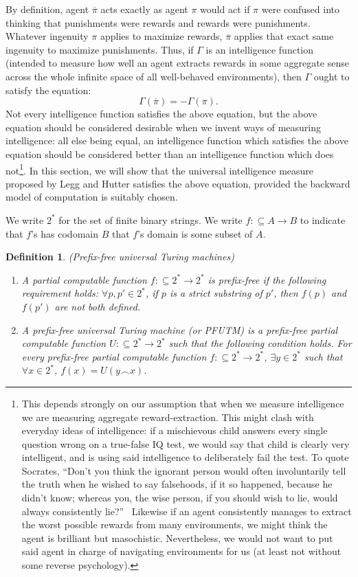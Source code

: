 \documentclass{article}
\newtheorem{definition}[theorem]{Definition}
\begin{document}
By definition, agent $\overline\pi$ acts exactly as agent $\pi$ would
act if $\pi$ were confused into thinking that punishments were rewards
and rewards were punishments.
Whatever ingenuity $\pi$ applies to maximize rewards,
$\overline\pi$ applies that exact same ingenuity to maximize punishments.
Thus, if $\Gamma$ is an intelligence function (intended to measure how
well an agent extracts rewards in some aggregate sense across the whole
infinite space of all well-behaved environments), then $\Gamma$ ought
to satisfy the equation:
\[
    \Gamma(\overline\pi) = -\Gamma(\pi).
\]
Not every intelligence function satisfies the above equation, but the
above equation should be considered desirable when we
invent ways of measuring intelligence: all else being equal, an
intelligence function which satisfies the above equation should be
considered better than an intelligence function which does
not\footnote{This depends strongly on our assumption that when we
measure intelligence we are measuring aggregate reward-extraction. This might clash
with everyday ideas of intelligence: if a mischievous child answers every single
question wrong on a true-false IQ test, we would say that child is clearly very
intelligent, and is using said intelligence to deliberately fail the test.
To quote Socrates, ``Don't you think the ignorant person would often involuntarily
tell the truth when he wished to say falsehoods, if it so happened, because he
didn't know; whereas you, the wise person, if you should wish to lie,
would always consistently lie?''\ \cite{lesserhippias}
Likewise if an agent consistently manages to extract the worst possible rewards
from many environments, we might think the agent is brilliant but
masochistic.
Nevertheless, we would not want to put said agent
in charge of navigating environments for us (at least not without some
reverse psychology).}.
In this section, we will show that the universal intelligence measure
proposed by Legg and Hutter satisfies the above equation, provided the
backward model of computation is suitably chosen.

We write $2^*$ for the set of finite binary strings.
We write $f:\subseteq A\to B$ to indicate that $f$'s has codomain $B$
that $f$'s domain is some subset of $A$.

\begin{definition}
    (Prefix-free universal Turing machines)
    \begin{enumerate}
        \item A partial computable function $f:\subseteq 2^*\to 2^*$
        is \emph{prefix-free} if the following requirement holds:
        $\forall p,p'\in 2^*$, if $p$ is a strict substring of $p'$,
        then $f(p)$ and $f(p')$ are not both defined.
        \item A \emph{prefix-free universal Turing machine}
        (or \emph{PFUTM}) is a prefix-free
        partial computable function $U:\subseteq 2^*\to 2^*$
        such that the following condition holds.
        For every prefix-free partial computable function
        $f:\subseteq 2^*\to 2^*$, $\exists y\in 2^*$ such that
        $\forall x\in 2^*$, $f(x)=U(y\frown x)$.
    \end{enumerate}
\end{definition}
\end{document}
